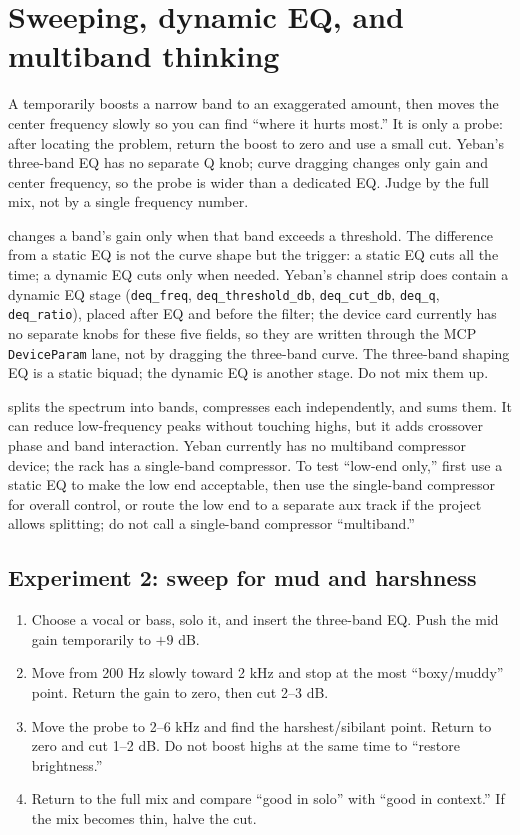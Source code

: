 \section{Sweeping, dynamic EQ, and multiband thinking}

A  temporarily boosts a narrow band to an exaggerated amount, then moves the center frequency slowly so you can find ``where it hurts most.'' It is only a probe: after locating the problem, return the boost to zero and use a small cut. Yeban's three-band EQ has no separate Q knob; curve dragging changes only gain and center frequency, so the probe is wider than a dedicated EQ. Judge by the full mix, not by a single frequency number.

 changes a band's gain only when that band exceeds a threshold. The difference from a static EQ is not the curve shape but the trigger: a static EQ cuts all the time; a dynamic EQ cuts only when needed. Yeban's channel strip does contain a dynamic EQ stage (\texttt{deq\_freq}, \texttt{deq\_threshold\_db}, \texttt{deq\_cut\_db}, \texttt{deq\_q}, \texttt{deq\_ratio}), placed after EQ and before the filter; the device card currently has no separate knobs for these five fields, so they are written through the MCP \texttt{DeviceParam} lane, not by dragging the three-band curve. The three-band shaping EQ is a static biquad; the dynamic EQ is another stage. Do not mix them up.

 splits the spectrum into bands, compresses each independently, and sums them. It can reduce low-frequency peaks without touching highs, but it adds crossover phase and band interaction. Yeban currently has no multiband compressor device; the rack has a single-band compressor. To test ``low-end only,'' first use a static EQ to make the low end acceptable, then use the single-band compressor for overall control, or route the low end to a separate aux track if the project allows splitting; do not call a single-band compressor ``multiband.''

\subsection{Experiment 2: sweep for mud and harshness}

\begin{enumerate}
  \item Choose a vocal or bass, solo it, and insert the three-band EQ. Push the mid gain temporarily to $+9$ dB.
  \item Move from 200 Hz slowly toward 2 kHz and stop at the most ``boxy/muddy'' point. Return the gain to zero, then cut 2--3 dB.
  \item Move the probe to 2--6 kHz and find the harshest/sibilant point. Return to zero and cut 1--2 dB. Do not boost highs at the same time to ``restore brightness.''
  \item Return to the full mix and compare ``good in solo'' with ``good in context.'' If the mix becomes thin, halve the cut.
\end{enumerate}

